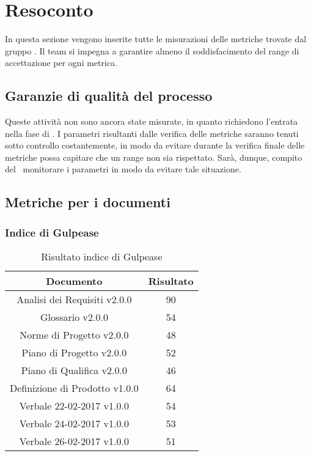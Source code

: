 \section{Resoconto}

In questa sezione vengono inserite tutte le misurazioni delle metriche trovate dal gruppo \gruppo.
Il team si impegna a garantire almeno il soddisfacimento del range di accettazione per ogni metrica.


\subsection{Garanzie di qualità del processo}

Queste attività non sono ancora state misurate, in quanto richiedono l'entrata nella fase di \COD. I parametri risultanti dalle verifica delle metriche saranno tenuti sotto controllo costantemente, in modo da evitare durante la verifica finale delle metriche possa capitare che un range non sia rispettato. Sarà, dunque, compito del \Ver\ monitorare i parametri in modo da evitare tale situazione.

\subsection{Metriche per i documenti}

\subsubsection{Indice di Gulpease}

\begin{table}[h]
	\begin{center}
		\begin{tabular}{|c|c|}
			\hline
			\textbf{Documento}	& \textbf{Risultato} \\
			\hline
			Analisi dei Requisiti v2.0.0 &	90\\
			\hline
			Glossario v2.0.0 &	54\\
			\hline
			Norme di Progetto v2.0.0 &	48\\
			\hline
			Piano di Progetto v2.0.0	&	52\\
			\hline
			Piano di Qualifica v2.0.0	&	46\\
			\hline
			Definizione di Prodotto v1.0.0	&	64\\
			\hline
			Verbale 22-02-2017 v1.0.0	&	54\\
			\hline
			Verbale 24-02-2017 v1.0.0	&	53\\
			\hline
			Verbale 26-02-2017 v1.0.0	&	51\\
			\hline
		\end{tabular}
	\end{center}
	\caption{Risultato indice di Gulpease}
\end{table}

